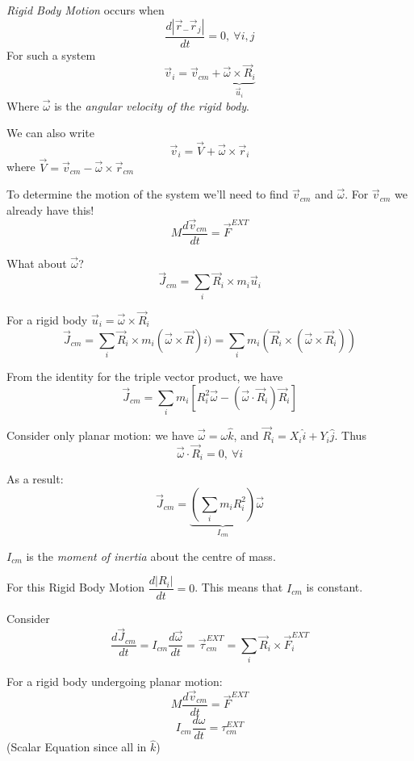 \setcounter{lecture}{8}


\begin{definition}
\emph{Rigid Body Motion} occurs when 
\[\frac{d|\vec{r}_- \vec{r}_j|}{dt} = 0,~ \forall i,j\]
For such a system
\[\vec{v}_i = \vec{v}_{cm} + \underbrace{\vec{\omega}\times\vec{R}_i}_{\vec{u}_i}\]	
Where $\vec{\omega}$ is the \emph{angular velocity of the rigid body}.

We can also write 
\[\vec{v}_i = \vec{V} + \vec{\omega}\times\vec{r}_i\]
where 
$\vec{V} = \vec{v}_{cm} - \vec{\omega}\times\vec{r}_{cm}$
\end{definition}

To determine the motion of the system we'll need to find $\vec{v}_{cm}$ and $\vec{\omega}$. For $\vec{v}_{cm}$ we already have this!
\begin{equation}M\frac{d\vec{v}_{cm}}{dt} = \vec{F}^{EXT}\end{equation}

What about $\vec{\omega}$?
\[\vec{J}_{cm} = \sum_i\vec{R}_i\times m_i\vec{u}_i\]

For a rigid body $\vec{u}_i = \vec{\omega}\times\vec{R}_i$
\[\vec{J}_{cm} = \sum_i\vec{R}_i \times m_i(\vec{\omega}\times\vec{R})i) = \sum_i m_i(\vec{R}_i\times(\vec{\omega}\times\vec{R}_i))\]

From the identity for the triple vector product, we have
\[\vec{J}_{cm} = \sum_im_i[R_i^2\vec{\omega} - (\vec{\omega}\cdot\vec{R}_i)\vec{R}_i]\]

Consider only planar motion: we have $\vec{\omega} = \omega\hat{k}$, and $\vec{R}_i = X_i\hat{i} + Y_i\hat{j}$. Thus 
\[\vec{\omega}\cdot\vec{R}_i = 0,~\forall i\]

As a result:
\begin{equation}
\vec{J}_{cm} = \underbrace{(\sum_im_iR_i^2)}_{I_{cm}}\vec{\omega}	
\end{equation}

\begin{definition}
$I_{cm}$ is the \emph{moment of inertia} about the centre of mass.	
\end{definition}

For this Rigid Body Motion $\dfrac{d|R_i|}{dt} = 0$. This means that $I_{cm}$ is constant.

Consider
\[\frac{d\vec{J}_{cm}}{dt} = I_{cm}\frac{d\vec{\omega}}{dt} = \vec{\tau}_{cm}^{EXT} = \sum_i\vec{R}_i\times\vec{F}_i^{EXT}\]

For a rigid body undergoing planar motion:
\begin{equation}M\frac{d\vec{v}_{cm}}{dt} = \vec{F}^{EXT}\end{equation}
\begin{equation}I_{cm}\frac{d{\omega}}{dt} = {\tau}_{cm}^{EXT}\end{equation}
 (Scalar Equation since all in $\hat{k}$)
 
